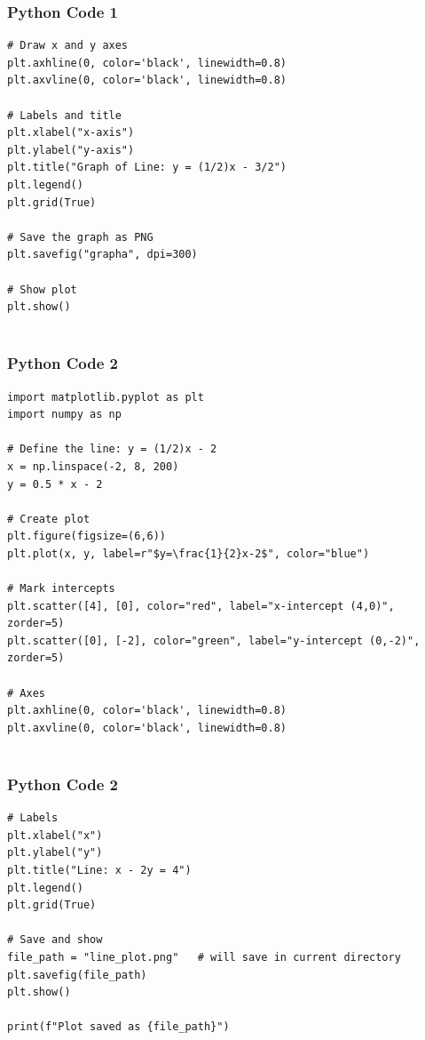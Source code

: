 \documentclass{beamer}
\begin{document}
\begin{frame}[fragile]
    \frametitle{Python Code 1}

    \begin{lstlisting}
# Draw x and y axes
plt.axhline(0, color='black', linewidth=0.8)
plt.axvline(0, color='black', linewidth=0.8)

# Labels and title
plt.xlabel("x-axis")
plt.ylabel("y-axis")
plt.title("Graph of Line: y = (1/2)x - 3/2")
plt.legend()
plt.grid(True)

# Save the graph as PNG
plt.savefig("grapha", dpi=300)

# Show plot
plt.show()


    \end{lstlisting}
\end{frame}

\begin{frame}[fragile]
    \frametitle{Python Code 2}

    \begin{lstlisting}
import matplotlib.pyplot as plt
import numpy as np

# Define the line: y = (1/2)x - 2
x = np.linspace(-2, 8, 200)
y = 0.5 * x - 2

# Create plot
plt.figure(figsize=(6,6))
plt.plot(x, y, label=r"$y=\frac{1}{2}x-2$", color="blue")

# Mark intercepts
plt.scatter([4], [0], color="red", label="x-intercept (4,0)", zorder=5)
plt.scatter([0], [-2], color="green", label="y-intercept (0,-2)", zorder=5)

# Axes
plt.axhline(0, color='black', linewidth=0.8)
plt.axvline(0, color='black', linewidth=0.8)


  \end{lstlisting}
\end{frame}
\begin{frame}[fragile]
    \frametitle{Python Code 2}

    \begin{lstlisting}
# Labels
plt.xlabel("x")
plt.ylabel("y")
plt.title("Line: x - 2y = 4")
plt.legend()
plt.grid(True)

# Save and show
file_path = "line_plot.png"   # will save in current directory
plt.savefig(file_path)
plt.show()

print(f"Plot saved as {file_path}")


  \end{lstlisting}
\end{frame}
\end{document}
